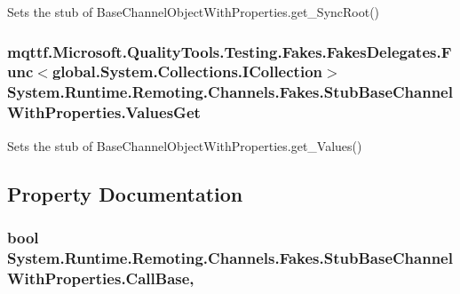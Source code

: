 Sets the stub of Base\-Channel\-Object\-With\-Properties.\-get\-\_\-\-Sync\-Root()

\hypertarget{class_system_1_1_runtime_1_1_remoting_1_1_channels_1_1_fakes_1_1_stub_base_channel_with_properties_aecd31387b1e94c55ab71ffa862474f04}{
\subsubsection[{Values\-Get}]{\setlength{\rightskip}{0pt plus 5cm}mqttf.\-Microsoft.\-Quality\-Tools.\-Testing.\-Fakes.\-Fakes\-Delegates.\-Func$<$global.\-System.\-Collections.\-I\-Collection$>$ System.\-Runtime.\-Remoting.\-Channels.\-Fakes.\-Stub\-Base\-Channel\-With\-Properties.\-Values\-Get}}\label{class_system_1_1_runtime_1_1_remoting_1_1_channels_1_1_fakes_1_1_stub_base_channel_with_properties_aecd31387b1e94c55ab71ffa862474f04}


Sets the stub of Base\-Channel\-Object\-With\-Properties.\-get\-\_\-\-Values()



\subsection{Property Documentation}
\hypertarget{class_system_1_1_runtime_1_1_remoting_1_1_channels_1_1_fakes_1_1_stub_base_channel_with_properties_ada29cc79ca0dc38eacc0b3810287e32e}{
\subsubsection[{Call\-Base}]{\setlength{\rightskip}{0pt plus 5cm}bool System.\-Runtime.\-Remoting.\-Channels.\-Fakes.\-Stub\-Base\-Channel\-With\-Properties.\-Call\-Base\hspace{0.3cm}{\ttfamily [get]}, {\ttfamily [set]}}}\label{class_system_1_1_runtime_1_1_remoting_1_1_channels_1_1_fakes_1_1_stub_base_channel_with_properties_ada29cc79ca0dc38eacc0b3810287e32e}


